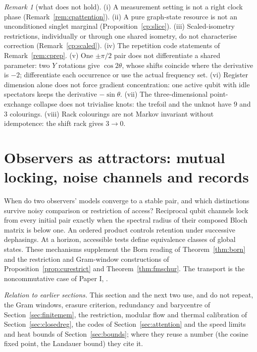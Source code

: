 \documentclass[aps,pra,onecolumn,superscriptaddress,nofootinbib,10pt]{revtex4-2}
\theoremstyle{definition}
\theoremstyle{remark}
\newtheorem{remark}[theorem]{Remark}
\begin{document}
\begin{remark}[what does not hold]\label{rem:cpnogo}
(i) A measurement setting is not a right clock phase (Remark~\ref{rem:cpattention}).  (ii) A pure graph-state resource
is not an unconditioned singlet marginal (Proposition~\ref{cp:slice}).  (iii) Scaled-isometry restrictions,
individually or through one shared isometry, do not characterise correction (Remark~\ref{cp:scaled}).  (iv) The
repetition code statements of Remark~\ref{rem:cprep}.  (v) One $\pm\pi/2$ pair does not differentiate a shared parameter:
two $Y$ rotations give $\cos2\theta$, whose shifts coincide where the derivative is $-2$; differentiate each occurrence or use
the actual frequency set.  (vi) Register dimension alone does not force gradient concentration: one active
qubit with idle spectators keeps the derivative $-\sin\theta$.  (vii) The three-dimensional point-exchange collapse
does not trivialise knots: the trefoil and the unknot have $9$ and $3$ colourings.  (viii) Rack colourings are not
Markov invariant without idempotence: the shift rack gives $3\to0$.
\end{remark}

\section{Observers as attractors: mutual locking, noise channels and records}\label{sec:observers}



When do two observers' models converge to a stable pair, and which
distinctions survive noisy comparison or restriction of access?
Reciprocal qubit channels lock from every initial pair exactly when
the spectral radius of their composed Bloch matrix is below one.
An ordered product controls retention under successive dephasings.
At a horizon, accessible tests define equivalence classes of global states.
These mechanisms supplement the Born reading of Theorem~\ref{thm:born}
and the restriction and Gram-window constructions of
Proposition~\ref{prop:curestrict} and Theorem~\ref{thm:fmschur}.
The transport is the noncommutative case of Paper I,
\cite[Thm.~3.1]{PaperI}.

\smallskip\noindent\emph{Relation to earlier sections.}  This section and the next two use, and do not repeat,
the Gram windows, erasure criterion, redundancy and barycentre of Section~\ref{sec:finitemem}, the restriction,
modular flow and thermal calibration of Section~\ref{sec:closedreg}, the codes of Section~\ref{sec:attention} and
the speed limits and heat bounds of Section~\ref{sec:bounds}; where they reuse a number (the cosine fixed point,
the Landauer bound) they cite it.
\end{document}
